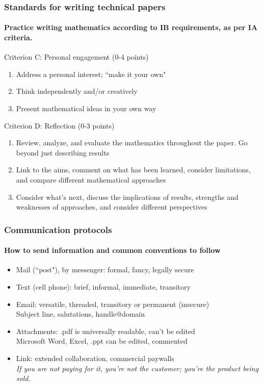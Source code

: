 \documentclass{beamer}
\begin{document}
 \frame
 {
   \frametitle{Standards for writing technical papers}
   \framesubtitle{Practice writing mathematics according to IB requirements, as per IA criteria.}
 Criterion C: Personal engagement (0-4 points)
 \begin{enumerate}
     \item Address a personal interest; ``make it your own"
     \item Think independently and/or creatively
     \item Present mathematical ideas in your own way
 \end{enumerate}
 Criterion D: Reflection (0-3 points)
 \begin{enumerate}
     \item Review, analyze, and evaluate the mathematics throughout the paper. Go beyond just describing results
     \item Link to the aims, comment on what has been learned, consider limitations, and compare different mathematical approaches
     \item Consider what's next, discuss the implications of results, strengths and weaknesses of approaches, and consider different perspectives
 \end{enumerate}
 }

 \frame
 {
   \frametitle{Communication protocols}
   \framesubtitle{How to send information and common conventions to follow}
 \begin{itemize}
       \item Mail (``post"), by messenger: formal, fancy, legally secure
       \item Text (cell phone): brief, informal, immediate, transitory
       \item Email: versatile, threaded, transitory or permanent (insecure)\\
       Subject line, salutations, handle@domain
       \item Attachments: .pdf is universally readable, can't be edited\\
       Microsoft Word, Excel, .ppt can be edited, commented
       \item Link: extended collaboration, commercial paywalls\\
       \emph{If you are not paying for it, you're not the customer; you're the product being sold.}
 \end{itemize}
  }
\end{document}
